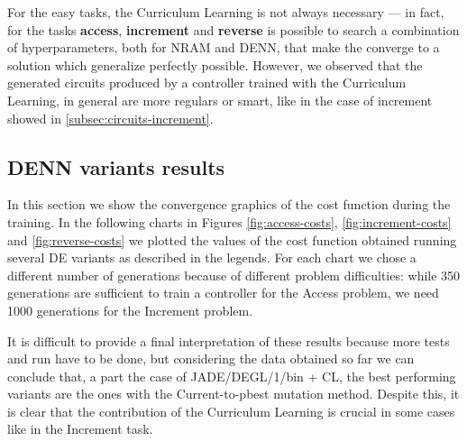 For the easy tasks, the Curriculum Learning is not always necessary --- in fact, for the tasks \textbf{access}, \textbf{increment} and \textbf{reverse} is possible to search a combination of hyperparameters, both for NRAM and DENN, that make the converge to a solution which generalize perfectly possible. However, we observed that the generated circuits produced by a controller trained with the Curriculum Learning, in general are more regulars or smart, like in the case of increment showed in \ref{subsec:circuits-increment}.
\clearpage

\subsection{DENN variants results}\label{subsec:circuits}
In this section we show the convergence graphics of the cost function during the training. In the following charts in Figures \ref{fig:access-costs}, \ref{fig:increment-costs} and \ref{fig:reverse-costs} we plotted the values of the cost function obtained running several DE variants as described in the legends. For each chart we chose a different number of generations because of different problem difficulties: while 350 generations are sufficient to train a controller for the Access problem, we need 1000 generations for the Increment problem. 

It is difficult to provide a final interpretation of these results because more tests and run have to be done, but considering the data obtained so far we can conclude that, a part the case of JADE/DEGL/1/bin + CL, the best performing variants are the ones with the Current-to-pbest mutation method.  Despite this, it is clear that the contribution of the Curriculum Learning is crucial in some cases like in the Increment task.
